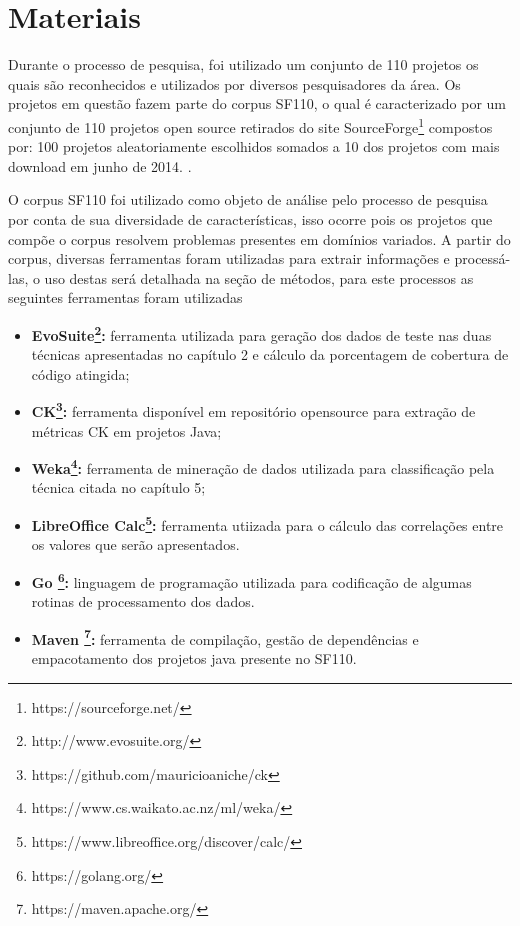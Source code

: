 \documentclass[
	12pt,				%
	oneside,			%
	a4paper,			%
	english,			%
	brazil				%
	]{abntex2ppgsi}
\begin{document}
\section{Materiais}

Durante o processo de pesquisa, foi utilizado um conjunto de 110 projetos os quais são reconhecidos e utilizados por diversos pesquisadores da área. Os projetos em questão fazem parte do corpus SF110, o qual é caracterizado por um conjunto de 110 projetos open source retirados do site SourceForge\footnote{https://sourceforge.net/} compostos por: 100 projetos aleatoriamente escolhidos somados a  10 dos projetos com mais download em junho de 2014. \cite{shamriski20151115}.

O corpus SF110 foi utilizado como objeto de análise pelo processo de pesquisa por conta de sua diversidade de características, isso ocorre pois os projetos que compõe o corpus resolvem problemas presentes em domínios variados.  A partir do corpus, diversas ferramentas foram utilizadas para extrair informações e processá-las, o uso destas será detalhada na seção de métodos, para este processos as seguintes ferramentas foram utilizadas 



\begin{itemize}
  \item \textbf{EvoSuite\footnote{http://www.evosuite.org/}:} ferramenta utilizada para geração dos dados de teste nas duas técnicas apresentadas no capítulo 2 e cálculo da porcentagem de cobertura de código atingida;
  \item \textbf{CK\footnote{https://github.com/mauricioaniche/ck}:} ferramenta disponível em repositório opensource para extração de métricas CK em projetos Java;
  \item \textbf{Weka\footnote{https://www.cs.waikato.ac.nz/ml/weka/}:} ferramenta de mineração de dados utilizada para classificação pela técnica citada no capítulo 5;
  \item \textbf{LibreOffice Calc\footnote{https://www.libreoffice.org/discover/calc/}:} ferramenta utiizada para o cálculo das correlações entre os valores que serão apresentados.
  \item \textbf{Go \footnote{https://golang.org/}:} linguagem de programação utilizada para codificação de algumas rotinas de processamento dos dados.
  \item \textbf{Maven \footnote{https://maven.apache.org/}:} ferramenta de compilação, gestão de dependências e empacotamento dos projetos java presente no SF110.
\end{itemize}
\end{document}
